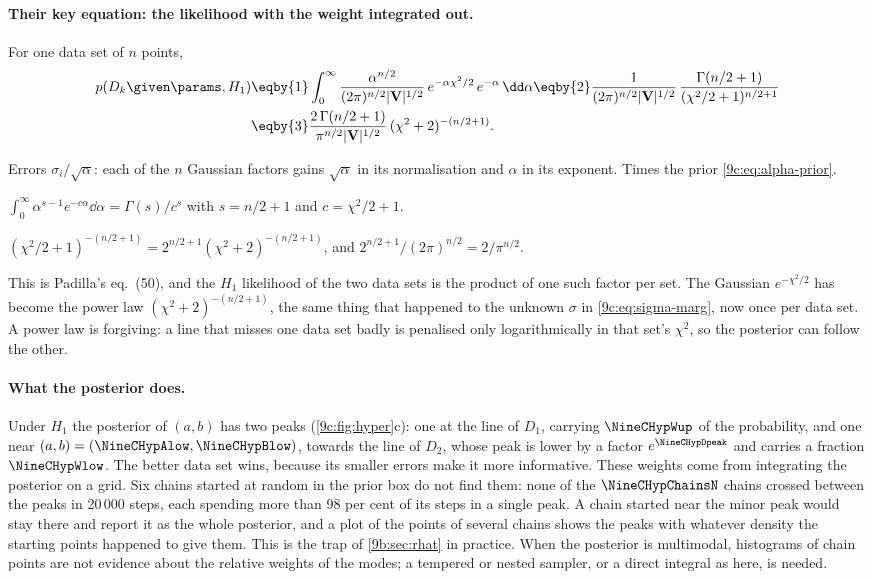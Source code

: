 \paragraph{Their key equation: the likelihood with the weight integrated out.} For one data set of $n$ points,
\begin{align}
  p(D_k\given\params,H_1)
  &\eqby{1}\int_0^\infty\frac{\alpha^{n/2}}{(2\pi)^{n/2}|\mathbf V|^{1/2}}\,e^{-\alpha\chi^2/2}\,e^{-\alpha}\,\dd\alpha
   \eqby{2}\frac{1}{(2\pi)^{n/2}|\mathbf V|^{1/2}}\,
     \frac{\Gamma(n/2+1)}{(\chi^2/2+1)^{n/2+1}}
   \nonumber\\
  &\eqby{3}\frac{2\,\Gamma(n/2+1)}{\pi^{n/2}|\mathbf V|^{1/2}}\,(\chi^2+2)^{-(n/2+1)} .
  \label{9c:eq:hyper}
\end{align}
\begin{explain}
  \item Errors $\sigma_i/\sqrt\alpha$: each of the $n$ Gaussian factors gains $\sqrt\alpha$ in its
        normalisation and $\alpha$ in its exponent. Times the prior \eqref{9c:eq:alpha-prior}.
  \item $\int_0^\infty\alpha^{s-1}e^{-c\alpha}\dd\alpha=\Gamma(s)/c^s$ with $s=n/2+1$ and $c=\chi^2/2+1$.
  \item $(\chi^2/2+1)^{-(n/2+1)}=2^{n/2+1}(\chi^2+2)^{-(n/2+1)}$, and $2^{n/2+1}/(2\pi)^{n/2}=2/\pi^{n/2}$.
\end{explain}
This is Padilla's eq.~(50), and the $H_1$ likelihood of the two data sets is the product of one such factor per
set. The Gaussian $e^{-\chi^2/2}$ has become the power law $(\chi^2+2)^{-(n/2+1)}$,
the same thing that happened to the unknown $\sigma$ in \eqref{9c:eq:sigma-marg}, now once per data set.
A power law is forgiving: a line that misses one data set badly is penalised only logarithmically in
that set's $\chi^2$, so the posterior can follow the other.

\paragraph{What the posterior does.} Under $H_1$ the posterior of $(a,b)$ has two peaks
(\cref{9c:fig:hyper}c): one at the line of $D_1$, carrying $\NineCHypWup$ of the probability, and one near
$(a,b)=(\NineCHypAlow,\NineCHypBlow)$, towards the line of $D_2$, whose peak is lower by a factor
$e^{\NineCHypDpeak}$ and carries a fraction $\NineCHypWlow$. The better data set wins, because its smaller
errors make it more informative. These weights come from integrating the posterior on a grid. Six
chains started at random in the prior box do not find them: none of the $\NineCHypChainsN$ chains
crossed between the peaks in 20\,000 steps, each spending more than 98 per cent of its steps in a single
peak. A chain started near the minor peak would stay there and report it as the whole posterior, and a
plot of the points of several chains shows the peaks with whatever density the starting points happened
to give them. This is the trap of
\cref{9b:sec:rhat} in practice. When the posterior is multimodal, histograms of chain points are not
evidence about the relative weights of the modes; a tempered or nested sampler, or a direct
integral as here, is needed.

